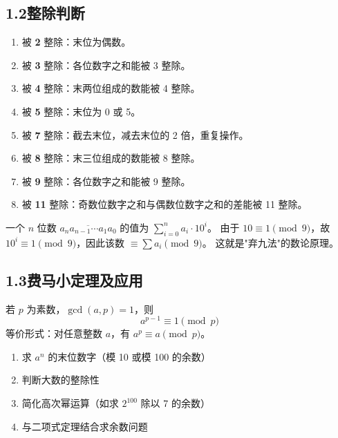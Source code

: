 \documentclass[12pt, a4paper]{ctexart}
\begin{document}
\subsection*{1.2\quad 整除判断}

\begin{knowledgebox}[常见整除判别法]
\begin{enumerate}[label=(\arabic*)]
  \item 被 \textbf{2} 整除：末位为偶数。
  \item 被 \textbf{3} 整除：各位数字之和能被 3 整除。
  \item 被 \textbf{4} 整除：末两位组成的数能被 4 整除。
  \item 被 \textbf{5} 整除：末位为 0 或 5。
  \item 被 \textbf{7} 整除：截去末位，减去末位的 2 倍，重复操作。
  \item 被 \textbf{8} 整除：末三位组成的数能被 8 整除。
  \item 被 \textbf{9} 整除：各位数字之和能被 9 整除。
  \item 被 \textbf{11} 整除：奇数位数字之和与偶数位数字之和的差能被 11 整除。
\end{enumerate}
\end{knowledgebox}

\begin{tipbox}[整除的代数本质]
一个 $n$ 位数 $\overline{a_n a_{n-1} \cdots a_1 a_0}$ 的值为 $\displaystyle\sum_{i=0}^{n} a_i \cdot 10^i$。
由于 $10 \equiv 1 \pmod{9}$，故 $10^i \equiv 1 \pmod{9}$，因此该数 $\equiv \sum a_i \pmod{9}$。
这就是"弃九法"的数论原理。
\end{tipbox}

\subsection*{1.3\quad 费马小定理及应用}

\begin{knowledgebox}[费马小定理]
若 $p$ 为素数，$\gcd(a, p) = 1$，则
\[ a^{p-1} \equiv 1 \pmod{p} \]
等价形式：对任意整数 $a$，有 $a^p \equiv a \pmod{p}$。
\end{knowledgebox}

\begin{tipbox}[费马小定理在高考中的应用场景]
\begin{enumerate}[label=(\arabic*)]
  \item 求 $a^n$ 的末位数字（模 10 或模 100 的余数）
  \item 判断大数的整除性
  \item 简化高次幂运算（如求 $2^{100}$ 除以 7 的余数）
  \item 与二项式定理结合求余数问题
\end{enumerate}
\end{tipbox}
\end{document}
